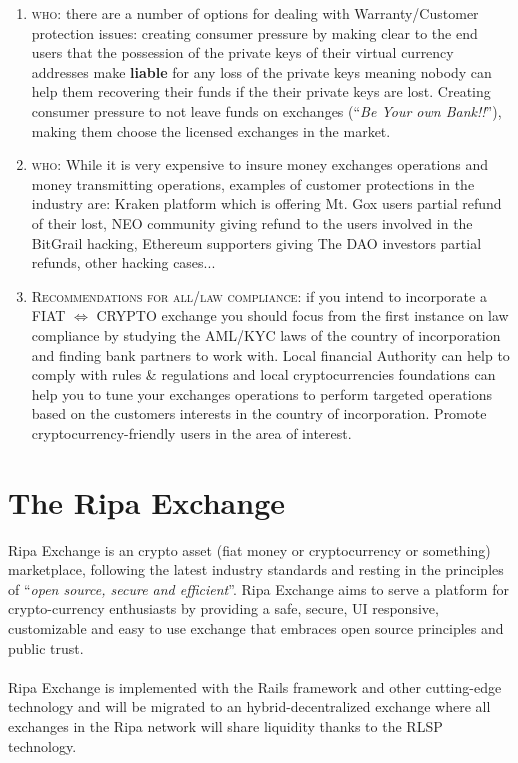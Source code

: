 \documentclass[11pt,fleqn,oneside]{book} %
\begin{document}
\begin{enumerate}
	\item \textsc{who}: there are a number of options for dealing with Warranty/Customer protection issues: 
	creating consumer pressure by making clear to the end users that the possession of the private keys of their
	virtual currency addresses make \textbf{liable} for any loss of the private keys meaning nobody can help
	them recovering their funds if the their private keys are lost. Creating consumer pressure to not leave funds
	on exchanges (``\textit{Be Your own Bank!!}''), making them choose the licensed exchanges in the market. 
	\item \textsc{who}: While it is very expensive to insure money exchanges operations and money transmitting operations, 
	examples of customer protections in the industry are: Kraken platform which is offering Mt. Gox users partial refund
	of their lost, NEO community giving refund to the users involved in the BitGrail hacking, Ethereum supporters
	giving The DAO investors partial refunds, other hacking cases...

	\item \textsc{Recommendations for all/law compliance}: if you intend to incorporate a FIAT $\Leftrightarrow$ CRYPTO exchange you should
	focus from the first instance on law compliance by studying the AML/KYC laws of the country of incorporation and
	finding bank partners to work with. Local financial Authority can help to comply with rules \& regulations and 
	local cryptocurrencies foundations can help you to tune your exchanges operations to perform targeted
	operations based on the customers interests in the country of incorporation.
	Promote cryptocurrency-friendly users in the area of interest.
\end{enumerate}




\chapter{The Ripa Exchange}
Ripa Exchange is an crypto asset (fiat money or cryptocurrency or something) marketplace, following the latest 
industry standards and resting in the principles of ``\textit{open source, secure and efficient}''. Ripa Exchange
aims to serve a platform for crypto-currency enthusiasts by providing a safe, secure, UI responsive, customizable 
and easy to use exchange that embraces open source principles and public trust.\\\\
Ripa Exchange is implemented with the Rails framework and other cutting-edge technology and will be migrated to an
hybrid-decentralized exchange where all exchanges in the Ripa network will share liquidity thanks to the RLSP technology.
\end{document}
